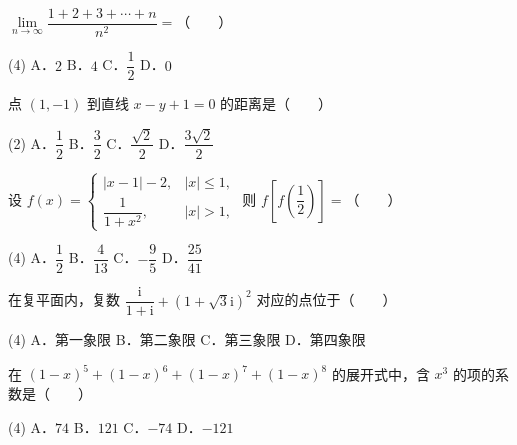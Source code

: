 
\begin{question}
$\lim\limits_{n \to \infty}\dfrac{1 + 2 + 3 + \cdots + n}{n^2} =$\mbox{（　　）}

\begin{gkopts}(4)
\task A．$2$
\task B．$4$
\task C．$\dfrac{1}{2}$
\task D．$0$
\end{gkopts}

\end{question}
\begin{question}
点 $(1, -1)$ 到直线 $x - y + 1 = 0$ 的距离是\mbox{（　　）}

\begin{gkopts}(2)
\task A．$\dfrac{1}{2}$
\task B．$\dfrac{3}{2}$
\task C．$\dfrac{\sqrt{2}}{2}$
\task D．$\dfrac{3\sqrt{2}}{2}$
\end{gkopts}

\end{question}
\begin{question}
设 $f(x) = \begin{cases}|x - 1| - 2, & |x| \leqslant 1,\\ \dfrac{1}{1 + x^2}, & |x| > 1,\end{cases}$ 则 $f\left[f\left(\dfrac{1}{2}\right)\right] =$\mbox{（　　）}

\begin{gkopts}(4)
\task A．$\dfrac{1}{2}$
\task B．$\dfrac{4}{13}$
\task C．$-\dfrac{9}{5}$
\task D．$\dfrac{25}{41}$
\end{gkopts}

\end{question}
\begin{question}
在复平面内，复数 $\dfrac{\mathrm{i}}{1 + \mathrm{i}} + (1 + \sqrt{3}\mathrm{i})^2$ 对应的点位于\mbox{（　　）}

\begin{gkopts}(4)
\task A．第一象限
\task B．第二象限
\task C．第三象限
\task D．第四象限
\end{gkopts}

\end{question}
\begin{question}
在 $(1 - x)^5 + (1 - x)^6 + (1 - x)^7 + (1 - x)^8$ 的展开式中，含 $x^3$ 的项的系数是\mbox{（　　）}

\begin{gkopts}(4)
\task A．$74$
\task B．$121$
\task C．$-74$
\task D．$-121$
\end{gkopts}

\end{question}
